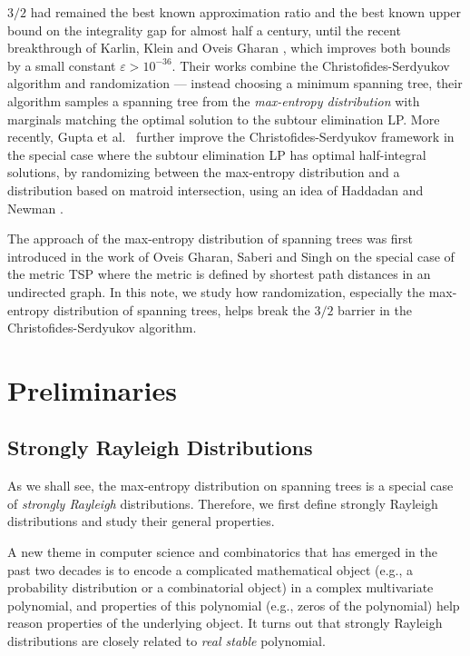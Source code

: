 \documentclass[letterpaper, reqno,12pt]{article}
\begin{document}
$3/2$ had remained the best known approximation ratio and the best known upper bound on the integrality gap for almost half a century, until the recent breakthrough of Karlin, Klein and Oveis Gharan \cite{karlin2021slightly, karlin2021slightlyig}, which improves both bounds by a small constant $\varepsilon > 10^{-36}$. Their works combine the Christofides-Serdyukov algorithm and randomization --- instead choosing a minimum spanning tree, their algorithm samples a spanning tree from the \emph{max-entropy distribution} with marginals matching the optimal solution to the subtour elimination LP. More recently, Gupta et al.\ \cite{gupta2021matroid} further improve the Christofides-Serdyukov framework in the special case where the subtour elimination LP has optimal half-integral solutions, by randomizing between the max-entropy distribution and a distribution based on matroid intersection, using an idea of Haddadan and Newman \cite{haddadan2019towards}.

The approach of the max-entropy distribution of spanning trees was first introduced in the work of Oveis Gharan, Saberi and Singh \cite{gharan2011randomized} on the special case of the metric TSP where the metric is defined by shortest path distances in an undirected graph. In this note, we study how randomization, especially the max-entropy distribution of spanning trees, helps break the $3/2$ barrier in the Christofides-Serdyukov algorithm.

\section{Preliminaries}

\subsection{Strongly Rayleigh Distributions}

As we shall see, the max-entropy distribution on spanning trees is a special case of \emph{strongly Rayleigh} distributions. Therefore, we first define strongly Rayleigh distributions and study their general properties.

A new theme in computer science and combinatorics that has emerged in the past two decades is to encode a complicated mathematical object (e.g., a probability distribution or a combinatorial object) in a complex multivariate polynomial, and properties of this polynomial (e.g., zeros of the polynomial) help reason properties of the underlying object. It turns out that strongly Rayleigh distributions are closely related to \emph{real stable} polynomial.
\end{document}
